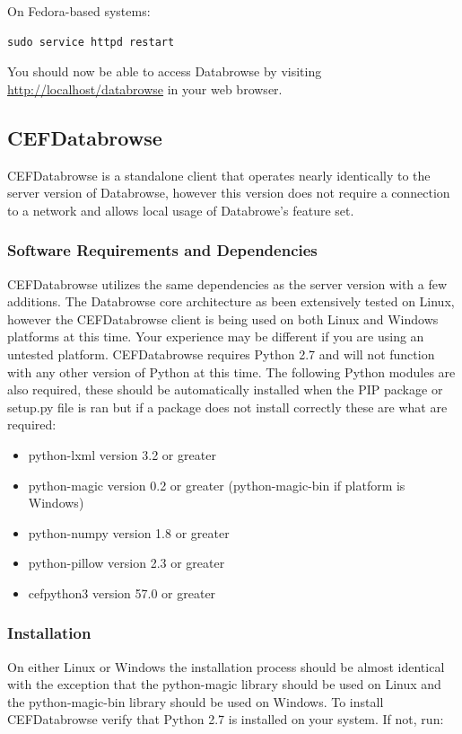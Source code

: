 \documentclass[10pt]{article}
\begin{document}
On Fedora-based systems:

\begin{verbatim}
sudo service httpd restart
\end{verbatim}

You should now be able to access Databrowse by visiting \url{http://localhost/databrowse} in your web browser.

\subsection{CEFDatabrowse}
CEFDatabrowse is a standalone client that operates nearly identically to the server version of Databrowse, however this version does not require a connection to a network and allows local usage of Databrowe's feature set.

\subsubsection{Software Requirements and Dependencies}
CEFDatabrowse utilizes the same dependencies as the server version with a few additions. The Databrowse core architecture as been extensively tested on Linux, however the CEFDatabrowse client is being used on both Linux and Windows platforms at this time. Your experience may be different if you are using an untested platform.
CEFDatabrowse requires Python 2.7 and will not function with any other version of Python at this time. The following Python modules are also required, these should be automatically installed when the PIP package or setup.py file is ran but if a package does not install correctly these are what are required:

\begin{itemize}
\item python-lxml version 3.2 or greater
\item python-magic version 0.2 or greater (python-magic-bin if platform is Windows)
\item python-numpy version 1.8 or greater
\item python-pillow version 2.3 or greater
\item cefpython3 version 57.0 or greater
\end{itemize}
\subsubsection{Installation}
On either Linux or Windows the installation process should be almost identical with the exception that the python-magic library should be used on Linux and the python-magic-bin library should be used on Windows. To install CEFDatabrowse verify that Python 2.7 is installed on your system. If not, run:
\end{document}
